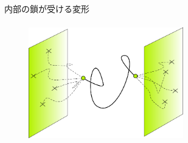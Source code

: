 \documentclass[11pt, dvipdfmx]{beamer}
\begin{document}
\begin{frame}
\begin{columns}[totalwidth=1\textwidth]
\begin{exampleblock}{内部の鎖が受ける変形}
\begin{align*}
\end{align*}
\vspace{-7mm}
\begin{figure}
\centering
\includegraphics[width=0.6\textwidth]{./fig/phantom.png}
\end{figure}
\end{exampleblock}
\end{columns}
\end{frame}
\end{document}
